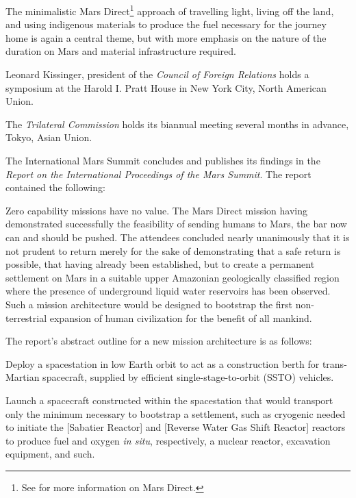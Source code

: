The minimalistic Mars Direct\footnote{See  for more information on Mars Direct.} approach of travelling light, living off the land, and using indigenous materials to produce the fuel necessary for the journey home is again a central theme, but with more emphasis on the nature of the duration on Mars and material infrastructure required.
\StopTimelineDate

Leonard Kissinger, president of the {\it Council of Foreign Relations} holds a symposium at the Harold I. Pratt House in New York City, North American Union.
\StopTimelineDate

The {\it Trilateral Commission} holds its biannual meeting several months in advance, Tokyo, Asian Union.
\StopTimelineDate

The International Mars Summit concludes and publishes its findings in the {\it Report on the International Proceedings of the Mars Summit}. The report contained the following:
\crlf

\startTimelineDocument
Zero capability missions have no value. The Mars Direct mission having demonstrated successfully the feasibility of sending humans to Mars, the bar now can and should be pushed. The attendees concluded nearly unanimously that it is not prudent to return merely for the sake of demonstrating that a safe return is possible, that having already been established, but to create a permanent settlement on Mars in a suitable upper Amazonian geologically classified region where the presence of underground liquid water reservoirs has been observed. Such a mission architecture would be designed to bootstrap the first non-terrestrial expansion of human civilization for the benefit of all mankind.
\stopTimelineDocument
\crlf

The report's abstract outline for a new mission architecture is as follows:

\startitemize[n]
\item Deploy a spacestation in low Earth orbit to act as a construction berth for trans-Martian spacecraft, supplied by efficient single-stage-to-orbit (SSTO) vehicles.

\item Launch a spacecraft constructed within the spacestation that would transport only the minimum necessary to bootstrap a settlement, such as cryogenic  needed to initiate the [Sabatier Reactor] and [Reverse Water Gas Shift Reactor] reactors to produce fuel and oxygen {\it in situ}, respectively, a nuclear reactor, excavation equipment, and such.

